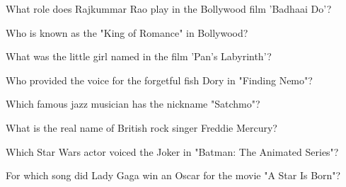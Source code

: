\documentclass[12pt,a4paper]{book}
\begin{document}
\begin{enhancedmcq}[Question 27]{What role does Rajkummar Rao play in the Bollywood film 'Badhaai Do'?}
\end{enhancedmcq}

\begin{enhancedmcq}[Question 28]{Who is known as the "King of Romance" in Bollywood?}
\end{enhancedmcq}

\begin{enhancedmcq}[Question 29]{What was the little girl named in the film 'Pan's Labyrinth'?}
\end{enhancedmcq}

\begin{enhancedmcq}[Question 30]{Who provided the voice for the forgetful fish Dory in "Finding Nemo"?}
\end{enhancedmcq}

\begin{enhancedmcq}[Question 31]{Which famous jazz musician has the nickname "Satchmo"?}
\end{enhancedmcq}

\begin{enhancedmcq}[Question 32]{What is the real name of British rock singer Freddie Mercury?}
\end{enhancedmcq}

\begin{enhancedmcq}[Question 33]{Which Star Wars actor voiced the Joker in "Batman: The Animated Series"?}
\end{enhancedmcq}

\begin{enhancedmcq}[Question 34]{For which song did Lady Gaga win an Oscar for the movie "A Star Is Born"?}
\end{enhancedmcq}
\end{document}
